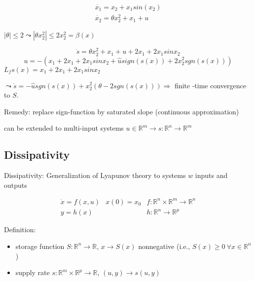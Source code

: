 \begin{Example}
\begin{equation*}
\begin{array}{l}
     \dot{x_1} = x_2 + x_1 sin(x_2)\\
     \dot{x_2} = \theta x_2^2 + x_1 + u
\end{array}
\end{equation*}

$|\theta| \leq 2 \leadsto |\theta x_2^2| \leq 2x_2^2 = \beta(x)$

\begin{equation*}
\dot{s} = \theta x_2^2 + x_1 +u +2x_1 +2x_1sinx_2
\end{equation*}
\begin{equation*}
u = -(x_1 +2x_1 +2x_1sinx_2 + \hat{u}sign(s(x)) + 2x_2^2sgn(s(x)))
\end{equation*}
$L_fs(x) = x_1 +2x_1 +2x_1sinx_2$

$\leadsto \dot{s} = - \hat{u}sgn(s(x)) + x_2^2(\theta - 2sgn(s(x))) \Rightarrow$ finite -time convergence to $S$.
\end{Example}


Remedy: replace sign-function by saturated slope (continuous approximation)

can be extended to multi-input systems $u \in \mathbb{R}^m \to s: \mathbb{R}^n \to \mathbb{R}^m$

\subsection{Dissipativity}


Dissipativity: Generalization of Lyapunov theory to systems $w$ inputs and outputs

\begin{equation}\label{input-output}
\begin{array}{lll}
     \dot{x} = f(x,u) & x(0) = x_0 & f: \mathbb{R}^n \times \mathbb{R}^m \to \mathbb{R}^n \\
     y = h(x) & & h: \mathbb{R}^n \to \mathbb{R}^p
\end{array}
\end{equation}

Definition: 
\begin{itemize}
\item storage function $S: \mathbb{R}^n \to \mathbb{R}$, $x \to S(x)$ nonnegative (i.e., $S(x) \geq 0 \ \forall x \in \mathbb{R}^n$)
\item supply rate $s: \mathbb{R}^m \times \mathbb{R}^p \to \mathbb{R}$, $(u,y) \to s(u,y)$
\end{itemize}

